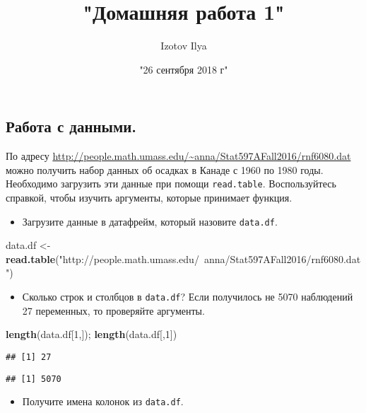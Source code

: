 \documentclass[]{article}
\title{"Домашняя работа 1"}
\author{Izotov Ilya}
\date{"26 сентября 2018 г"}
\newenvironment{Shaded}{\begin{snugshade}}{\end{snugshade}}
\newcommand{\KeywordTok}[1]{\textcolor[rgb]{0.13,0.29,0.53}{\textbf{#1}}}
\newcommand{\DecValTok}[1]{\textcolor[rgb]{0.00,0.00,0.81}{#1}}
\newcommand{\StringTok}[1]{\textcolor[rgb]{0.31,0.60,0.02}{#1}}
\newcommand{\NormalTok}[1]{#1}
\providecommand{\tightlist}{%
  \setlength{\itemsep}{0pt}\setlength{\parskip}{0pt}}
\begin{document}
\maketitle

\subsection{Работа с данными.}\label{--.}

По адресу
\url{http://people.math.umass.edu/~anna/Stat597AFall2016/rnf6080.dat}
можно получить набор данных об осадках в Канаде с 1960 по 1980 годы.
Необходимо загрузить эти данные при помощи \texttt{read.table}.
Воспользуйтесь справкой, чтобы изучить аргументы, которые принимает
функция.

\begin{itemize}
\tightlist
\item
  Загрузите данные в датафрейм, который назовите \texttt{data.df}.
\end{itemize}

\begin{Shaded}
\begin{Highlighting}[]
\NormalTok{data.df <-}\StringTok{ }\KeywordTok{read.table}\NormalTok{(}\StringTok{"http://people.math.umass.edu/~anna/Stat597AFall2016/rnf6080.dat"}\NormalTok{)}
\end{Highlighting}
\end{Shaded}

\begin{itemize}
\tightlist
\item
  Сколько строк и столбцов в \texttt{data.df}? Если получилось не 5070
  наблюдений 27 переменных, то проверяйте аргументы.
\end{itemize}

\begin{Shaded}
\begin{Highlighting}[]
\KeywordTok{length}\NormalTok{(data.df[}\DecValTok{1}\NormalTok{,]); }\KeywordTok{length}\NormalTok{(data.df[,}\DecValTok{1}\NormalTok{])}
\end{Highlighting}
\end{Shaded}

\begin{verbatim}
## [1] 27
\end{verbatim}

\begin{verbatim}
## [1] 5070
\end{verbatim}

\begin{itemize}
\tightlist
\item
  Получите имена колонок из \texttt{data.df}.
\end{itemize}
\end{document}
